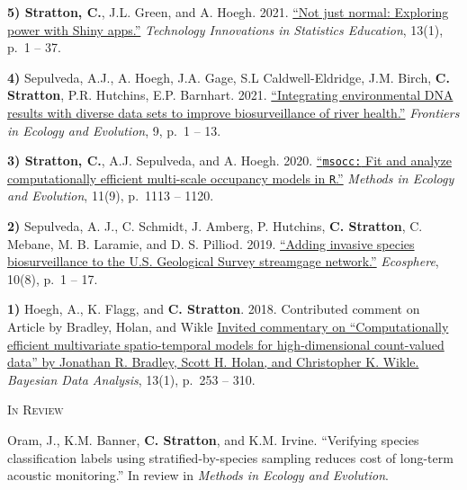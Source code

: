 \documentclass[a4paper]{article}
\newcommand{\subheader} [1] {
	{\hspace*{-9pt}\vspace*{6pt} \textcolor{Cerulean}{\textsc{#1}}}
	\vspace*{-6pt}
}
\begin{document}
\textbf{5) Stratton, C.}, J.L. Green, and A. Hoegh. 2021.
\href{https://doi.org/10.5070/T513146468}{``Not just normal: Exploring
power with Shiny apps.''}
\textit{Technology Innovations in Statistics Education}, 13(1), p.~1 --
37. \vspace*{2mm}

\textbf{4)} Sepulveda, A.J., A. Hoegh, J.A. Gage, S.L Caldwell-Eldridge,
J.M. Birch, \textbf{C. Stratton}, P.R. Hutchins, E.P. Barnhart. 2021.
\href{https://doi.org/10.3389/fevo.2021.620715}{``Integrating
environmental DNA results with diverse data sets to improve
biosurveillance of river health.''}
\textit{Frontiers in Ecology and Evolution}, 9, p.~1 -- 13.
\vspace*{2mm}

\textbf{3) Stratton, C.}, A.J. Sepulveda, and A. Hoegh. 2020.
\href{https://doi.org/10.1111/2041-210X.13442}{``\texttt{msocc:} Fit and
analyze computationally efficient multi-scale occupancy models in
\texttt{R}.''} \textit{Methods in Ecology and Evolution}, 11(9), p.~1113
-- 1120. \vspace*{2mm}

\textbf{2)} Sepulveda, A. J., C. Schmidt, J. Amberg, P. Hutchins,
\textbf{C. Stratton}, C. Mebane, M. B. Laramie, and D. S. Pilliod. 2019.
\href{https://doi.org/10.1002/ecs2.2843}{``Adding invasive species
biosurveillance to the U.S. Geological Survey streamgage network.''}
\textit{Ecosphere}, 10(8), p.~1 -- 17. \vspace*{2mm}

\textbf{1)} Hoegh, A., K. Flagg, and \textbf{C. Stratton}. 2018.
Contributed comment on Article by Bradley, Holan, and Wikle
\href{https://eds.p.ebscohost.com/abstract?site=eds\&scope=site\&jrnl=19360975\&AN=138950462\&h=fupOc1pyeH8dv67mdPoRzhYvo96LS\%2bzCYNHIjAcMPojnVBydkua\%2fXFU6RanU78MDh8WNMlzPVI\%2fBxvaUiWvg\%2bw\%3d\%3d\&crl=c\&resultLocal=ErrCrlNoResults\&resultNs=Ehost\&crlhashurl=login.aspx\%3fdirect\%3dtrue\%26profile\%3dehost\%26scope\%3dsite\%26authtype\%3dcrawler\%26jrnl\%3d19360975\%26AN\%3d138950462}{Invited
commentary on ``Computationally efficient multivariate spatio-temporal
models for high-dimensional count-valued data'' by Jonathan R. Bradley,
Scott H. Holan, and Christopher K. Wikle.}
\textit{Bayesian Data Analysis}, 13(1), p.~253 -- 310. \vspace*{2mm}

\subheader{In Review}
\vspace*{2mm}

Oram, J., K.M. Banner, \textbf{C. Stratton}, and K.M. Irvine.
``Verifying species classification labels using stratified-by-species
sampling reduces cost of long-term acoustic monitoring.'' In review in
\textit{Methods in Ecology and Evolution}. \vspace*{2mm}
\end{document}
